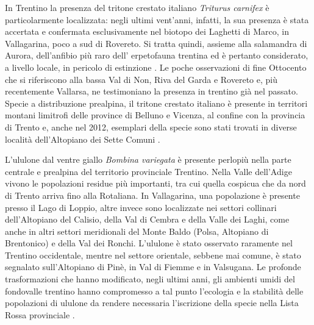 \documentclass[10pt,twoside,openany,x11names,svgnames,italian,a5paper,dvipsnames,table]{memoir}
\begin{document}
In Trentino la presenza del tritone crestato italiano \emph{Triturus carnifex} è particolarmente localizzata: negli ultimi vent'anni, infatti, la sua presenza è stata accertata e confermata esclusivamente nel biotopo dei Laghetti di Marco, in Vallagarina, poco a sud di Rovereto. Si tratta quindi, assieme alla salamandra di Aurora, dell'anfibio più raro dell' erpetofauna trentina ed è pertanto considerato, a livello locale, in pericolo di estinzione \cite{AAVV04} \cite{Caldonazzi02}. Le poche osservazioni di fine Ottocento che si riferiscono alla bassa Val di Non, Riva del Garda e Rovereto e, più recentemente Vallarsa, ne testimoniano la presenza in trentino già nel passato. Specie a distribuzione prealpina, il tritone crestato italiano è presente in territori montani limitrofi delle province di Belluno e Vicenza, al confine con la provincia di Trento e, anche nel 2012, esemplari della specie sono stati trovati in diverse località dell'Altopiano dei Sette Comuni \cite{Bonato07} \cite{NISORIA}.

L'ululone dal ventre giallo \emph{Bombina variegata} è presente perlopiù nella parte centrale e prealpina del territorio provinciale Trentino. Nella Valle dell’Adige vivono le popolazioni residue più importanti, tra cui quella cospicua che da nord di Trento arriva fino alla Rotaliana. In Vallagarina, una popolazione è presente presso il Lago di Loppio, altre invece sono localizzate nei settori collinari dell’Altopiano del Calisio, della Val di Cembra e della Valle dei Laghi, come anche in altri settori meridionali del Monte Baldo (Polsa, Altopiano di Brentonico) e della Val dei Ronchi. L’ululone è stato osservato raramente nel Trentino occidentale, mentre nel settore orientale, sebbene mai comune, è stato segnalato sull’Altopiano di Pinè, in Val di Fiemme e in Valsugana.
Le profonde trasformazioni che hanno modificato, negli ultimi anni, gli ambienti umidi del fondovalle trentino hanno compromesso a tal punto l’ecologia e la stabilità delle popolazioni di ululone da rendere necessaria l’iscrizione della specie nella Lista Rossa provinciale \cite{AAVV11a} \cite{Caldonazzi02}.
\vspace{-.5cm}
\end{document}
